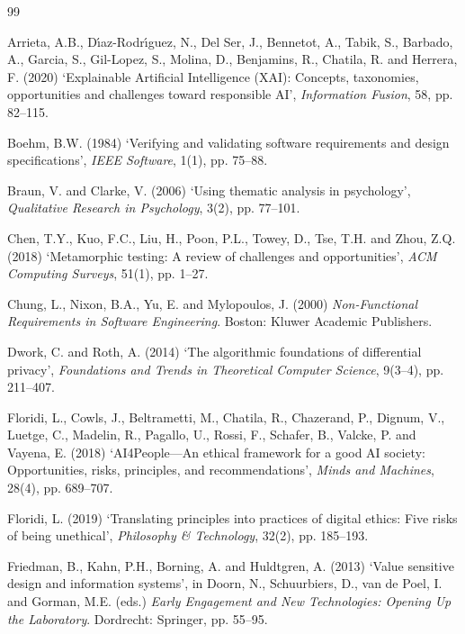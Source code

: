\documentclass[11pt,a4paper]{article}
\begin{document}
\begin{thebibliography}{99}

Arrieta, A.B., D\'{\i}az-Rodr\'{\i}guez, N., Del Ser, J., Bennetot, A., Tabik, S., Barbado, A., Garcia, S., Gil-Lopez, S., Molina, D., Benjamins, R., Chatila, R. and Herrera, F. (2020) `Explainable Artificial Intelligence (XAI): Concepts, taxonomies, opportunities and challenges toward responsible AI', \textit{Information Fusion}, 58, pp. 82--115.

Boehm, B.W. (1984) `Verifying and validating software requirements and design specifications', \textit{IEEE Software}, 1(1), pp. 75--88.

Braun, V. and Clarke, V. (2006) `Using thematic analysis in psychology', \textit{Qualitative Research in Psychology}, 3(2), pp. 77--101.

Chen, T.Y., Kuo, F.C., Liu, H., Poon, P.L., Towey, D., Tse, T.H. and Zhou, Z.Q. (2018) `Metamorphic testing: A review of challenges and opportunities', \textit{ACM Computing Surveys}, 51(1), pp. 1--27.

Chung, L., Nixon, B.A., Yu, E. and Mylopoulos, J. (2000) \textit{Non-Functional Requirements in Software Engineering}. Boston: Kluwer Academic Publishers.

Dwork, C. and Roth, A. (2014) `The algorithmic foundations of differential privacy', \textit{Foundations and Trends in Theoretical Computer Science}, 9(3--4), pp. 211--407.

Floridi, L., Cowls, J., Beltrametti, M., Chatila, R., Chazerand, P., Dignum, V., Luetge, C., Madelin, R., Pagallo, U., Rossi, F., Schafer, B., Valcke, P. and Vayena, E. (2018) `AI4People---An ethical framework for a good AI society: Opportunities, risks, principles, and recommendations', \textit{Minds and Machines}, 28(4), pp. 689--707.

Floridi, L. (2019) `Translating principles into practices of digital ethics: Five risks of being unethical', \textit{Philosophy \& Technology}, 32(2), pp. 185--193.

Friedman, B., Kahn, P.H., Borning, A. and Huldtgren, A. (2013) `Value sensitive design and information systems', in Doorn, N., Schuurbiers, D., van de Poel, I. and Gorman, M.E. (eds.) \textit{Early Engagement and New Technologies: Opening Up the Laboratory}. Dordrecht: Springer, pp. 55--95.


\end{thebibliography}
\end{document}
